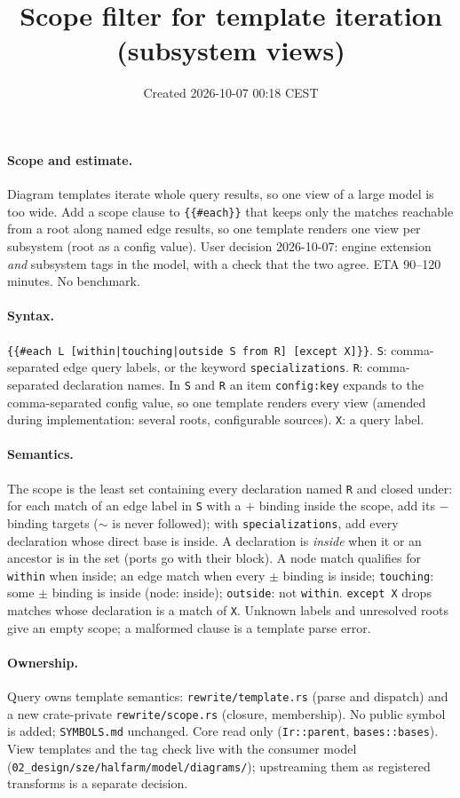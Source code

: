 \documentclass[11pt,a4paper]{article}
\title{Scope filter for template iteration (subsystem views)}
\date{Created 2026-10-07 00:18 CEST}
\begin{document}
\maketitle
\paragraph{Scope and estimate.} Diagram templates iterate whole query results, so one view
of a large model is too wide. Add a scope clause to \texttt{\{\{\#each\}\}} that keeps only the
matches reachable from a root along named edge results, so one template renders one view per
subsystem (root as a config value). User decision 2026-10-07: engine extension \emph{and}
subsystem tags in the model, with a check that the two agree. ETA 90--120 minutes. No benchmark.
\paragraph{Syntax.}
\texttt{\{\{\#each L [within|touching|outside S from R] [except X]\}\}}.
\texttt{S}: comma-separated edge query labels, or the keyword \texttt{specializations}.
\texttt{R}: comma-separated declaration names. In \texttt{S} and \texttt{R} an item
\texttt{config:key} expands to the comma-separated config value, so one template renders every
view (amended during implementation: several roots, configurable sources). \texttt{X}: a query label.
\paragraph{Semantics.} The scope is the least set containing every declaration named
\texttt{R} and closed under: for each match of an edge label in \texttt{S} with a $+$ binding
inside the scope, add its $-$ binding targets ($\sim$ is never followed); with
\texttt{specializations}, add every declaration whose direct base is inside. A declaration is
\emph{inside} when it or an ancestor is in the set (ports go with their block). A node match
qualifies for \texttt{within} when inside; an edge match when every $\pm$ binding is inside;
\texttt{touching}: some $\pm$ binding is inside (node: inside); \texttt{outside}: not
\texttt{within}. \texttt{except X} drops matches whose declaration is a match of \texttt{X}.
Unknown labels and unresolved roots give an empty scope; a malformed clause is a template
parse error.
\paragraph{Ownership.} Query owns template semantics: \texttt{rewrite/template.rs} (parse and
dispatch) and a new crate-private \texttt{rewrite/scope.rs} (closure, membership). No public
symbol is added; \texttt{SYMBOLS.md} unchanged. Core read only (\texttt{Ir::parent},
\texttt{bases::bases}). View templates and the tag check live with the consumer model
(\texttt{02\_design/sze/halfarm/model/diagrams/}); upstreaming them as registered transforms
is a separate decision.
\end{document}
